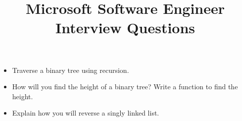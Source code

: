 \documentclass{article}
\begin{document}
\title{Microsoft Software Engineer Interview Questions}
\maketitle
\begin{itemize}
	\item Traverse a binary tree using recursion.
	\item How will you find the height of a binary tree? Write a function to find the height.
	\item Explain how you will reverse a singly linked list. 
\end{itemize}
\end{document}
